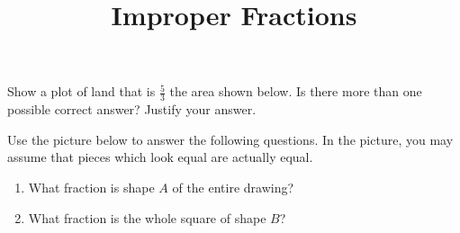 \documentclass{ximera}
\title{Improper Fractions}
\begin{document}
\begin{abstract}\end{abstract}
\maketitle



\begin{problem}
 Show a plot of land that is $\frac{5}{3}$ the area shown below.  Is there more than one possible correct answer? Justify your answer.

\begin{image}
\end{image}
\end{problem}

\begin{problem}
 Use the picture below to answer the following questions. In the picture, you may assume that pieces which look equal are actually equal. 
\begin{enumerate}
\item What fraction is shape $A$ of the entire drawing?
\item  What fraction is the whole square of shape $B$?
\end{enumerate}

\begin{image}
\end{image}
\end{problem}
\newpage
\end{document}
